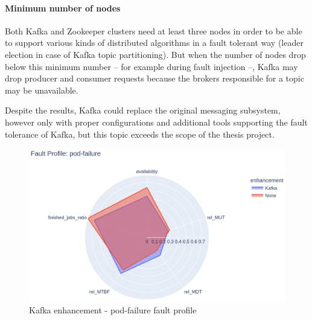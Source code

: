 \paragraph{Minimum number of nodes} Both Kafka and Zookeeper clusters need at least three nodes in order to be able to support various kinds of distributed algorithms in a fault tolerant way (\eg leader election in case of Kafka topic partitioning). But when the number of nodes drop below this minimum number -- for example during fault injection --, Kafka may drop producer and consumer requests because the brokers responsible for a topic may be unavailable.

Despite the results, Kafka could replace the original messaging subsystem, however only with proper configurations and additional tools supporting the fault tolerance of Kafka, but this topic exceeds the scope of the thesis project.

\begin{figure}[H]
	\centering
	\includegraphics[width=140mm, keepaspectratio]{figures/kafka_with_base_pod-failure.png}
	\caption{Kafka enhancement - pod-failure fault profile}
	\label{fig:kafka-results-pod-failure}
\end{figure}


